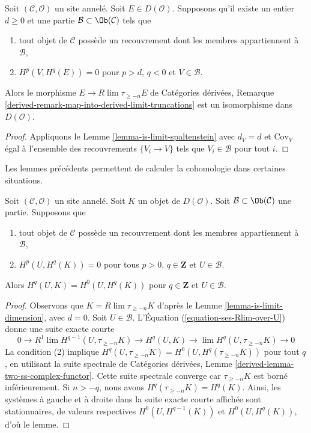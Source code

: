 \begin{lemma}
\label{lemma-is-limit-dimension}
Soit $(\mathcal{C}, \mathcal{O})$ un site annelé. Soit
$E \in D(\mathcal{O})$. Supposons qu'il existe un entier $d \geq 0$ et
une partie $\mathcal{B} \subset \Ob(\mathcal{C})$ tels que
\begin{enumerate}
\item tout objet de $\mathcal{C}$ possède un recouvrement dont les membres
appartiennent à $\mathcal{B}$,
\item $H^p(V, H^q(E)) = 0$ pour $p > d$, $q < 0$ et
$V \in \mathcal{B}$.
\end{enumerate}
Alors le morphisme $E \to R\lim \tau_{\geq -n} E$ de Catégories dérivées,
Remarque
\ref{derived-remark-map-into-derived-limit-truncations}
est un isomorphisme dans $D(\mathcal{O})$.
\end{lemma}

\begin{proof}
Appliquons le Lemme \ref{lemma-is-limit-spaltenstein} avec $d_V = d$ et
$\text{Cov}_V$ égal à l'ensemble des recouvrements $\{V_i \to V\}$ tels
que $V_i \in \mathcal{B}$ pour tout $i$.
\end{proof}

\noindent
Les lemmes précédents permettent de calculer la cohomologie dans certaines
situations.

\begin{lemma}
\label{lemma-cohomology-over-U-trivial}
Soit $(\mathcal{C}, \mathcal{O})$ un site annelé. Soit $K$ un objet de
$D(\mathcal{O})$. Soit $\mathcal{B} \subset \Ob(\mathcal{C})$ une partie.
Supposons que
\begin{enumerate}
\item tout objet de $\mathcal{C}$ possède un recouvrement dont les membres
appartiennent à $\mathcal{B}$,
\item $H^p(U, H^q(K)) = 0$ pour tous $p > 0$, $q \in \mathbf{Z}$ et
$U \in \mathcal{B}$.
\end{enumerate}
Alors $H^q(U, K) = H^0(U, H^q(K))$ pour $q \in \mathbf{Z}$ et
$U \in \mathcal{B}$.
\end{lemma}

\begin{proof}
Observons que $K = R\lim \tau_{\geq -n} K$ d'après le Lemme
\ref{lemma-is-limit-dimension}, avec $d = 0$. Soit
$U \in \mathcal{B}$. L'Équation (\ref{equation-ses-Rlim-over-U}) donne une
suite exacte courte
$$
0 \to R^1\lim H^{q - 1}(U, \tau_{\geq -n}K) \to
H^q(U, K) \to \lim H^q(U, \tau_{\geq -n}K) \to 0
$$
La condition (2) implique
$H^q(U, \tau_{\geq -n} K) = H^0(U, H^q(\tau_{\geq -n} K))$
pour tout $q$, en utilisant la suite spectrale de Catégories dérivées,
Lemme \ref{derived-lemma-two-ss-complex-functor}. Cette suite spectrale
converge car $\tau_{\geq -n}K$ est borné inférieurement. Si $n > -q$,
nous avons $H^q(\tau_{\geq -n}K) = H^q(K)$. Ainsi, les systèmes à gauche
et à droite dans la suite exacte courte affichée sont stationnaires, de
valeurs respectives $H^0(U, H^{q - 1}(K))$ et $H^0(U, H^q(K))$, d'où le
lemme.
\end{proof}

